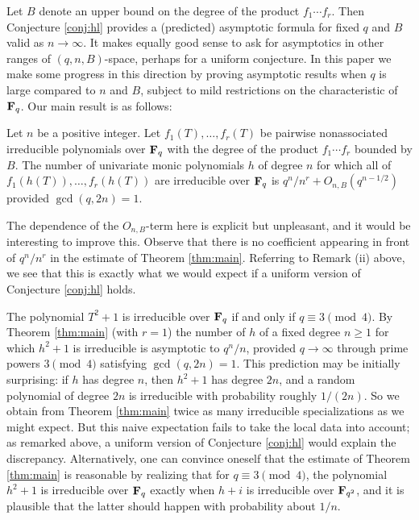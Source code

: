 \documentclass[a4paper]{compositio}
\begin{document}
Let $B$ denote an upper bound on the degree of the product
$f_1\cdots f_r$. Then Conjecture \ref{conj:hl} provides a
(predicted) asymptotic formula for fixed $q$ and $B$ valid as
$n\to\infty$. It makes equally good sense to ask for asymptotics in
other ranges of $(q,n,B)$-space, perhaps for a uniform conjecture.
In this paper we make some progress in this direction by proving
asymptotic results when $q$ is large compared to $n$ and $B$,
subject to mild restrictions on the characteristic of $\mathbf{F}_q$. Our
main result is as follows:

\begin{thm}\label{thm:main} Let $n$ be a positive integer. Let $f_1(T), \dots, f_r(T)$ be
pairwise nonassociated irreducible polynomials over $\mathbf{F}_q$ with the
degree of the product $f_1 \cdots f_r$ bounded by $B$. The number of
univariate monic polynomials $h$ of degree $n$ for which all of
$f_1(h(T)), \dots, f_r(h(T))$ are irreducible over $\mathbf{F}_q$ is
$q^n/n^r + O_{n,B}(q^{n-1/2})$ provided $\gcd(q,2n)=1$.
\end{thm}
\noindent The dependence of the $O_{n,B}$-term here is explicit but
unpleasant, and it would be interesting to improve this. Observe
that there is no coefficient appearing in front of $q^n/n^r$ in the
estimate of Theorem \ref{thm:main}. Referring to Remark (ii) above,
we see that this is exactly what we would expect if a uniform
version of Conjecture \ref{conj:hl} holds.

\begin{example} The polynomial $T^2+1$ is irreducible over
$\mathbf{F}_q$ if and only if $q \equiv 3 \pmod{4}$. By Theorem
\ref{thm:main} (with $r=1$) the number of $h$ of a fixed degree
$n\geq 1$ for which $h^2+1$ is irreducible is asymptotic to $q^n/n$,
provided $q\to\infty$ through prime powers $3\pmod{4}$ satisfying
$\gcd(q,2n)=1$. This prediction may be initially surprising: if $h$
has degree $n$, then $h^2+1$ has degree $2n$, and a random
polynomial of degree $2n$ is irreducible with probability roughly
$1/(2n)$. So we obtain from Theorem \ref{thm:main} twice as many
irreducible specializations as we might expect. But this naive
expectation fails to take the local data into account; as remarked
above, a uniform version of Conjecture \ref{conj:hl} would explain
the discrepancy. Alternatively, one can convince oneself that the
estimate of Theorem \ref{thm:main} is reasonable by realizing that
for $q\equiv 3 \pmod{4}$, the polynomial $h^2+1$ is irreducible over
$\mathbf{F}_q$ exactly when $h+i$ is irreducible over $\mathbf{F}_{q^2}$, and it is
plausible that the latter should happen with probability about
$1/n$.
\end{example}
\end{document}
